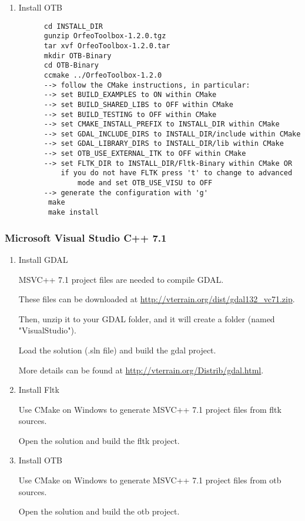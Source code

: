 \begin{enumerate}
\item Install OTB
  \begin{verbatim}
      cd INSTALL_DIR
      gunzip OrfeoToolbox-1.2.0.tgz
      tar xvf OrfeoToolbox-1.2.0.tar
      mkdir OTB-Binary
      cd OTB-Binary
      ccmake ../OrfeoToolbox-1.2.0
      --> follow the CMake instructions, in particular:
	  --> set BUILD_EXAMPLES to ON within CMake
	  --> set BUILD_SHARED_LIBS to OFF within CMake
	  --> set BUILD_TESTING to OFF within CMake
	  --> set CMAKE_INSTALL_PREFIX to INSTALL_DIR within CMake
	  --> set GDAL_INCLUDE_DIRS to INSTALL_DIR/include within CMake
	  --> set GDAL_LIBRARY_DIRS to INSTALL_DIR/lib within CMake
	  --> set OTB_USE_EXTERNAL_ITK to OFF within CMake
	  --> set FLTK_DIR to INSTALL_DIR/Fltk-Binary within CMake OR
	      if you do not have FLTK press 't' to change to advanced
              mode and set OTB_USE_VISU to OFF 
	  --> generate the configuration with 'g'
       make
       make install
  \end{verbatim}
      
  
\end{enumerate}

\subsubsection{Microsoft Visual Studio C++ 7.1}
\begin{enumerate}
\item Install GDAL

	MSVC++ 7.1 project files are needed to compile GDAL.
	
	These files can be downloaded at \url{http://vterrain.org/dist/gdal132_vc71.zip}.
	
	Then, unzip it to your GDAL folder, and it will create a folder (named "VisualStudio").
	
	Load the solution (.sln file) and build the gdal project.
	
	More details can be found at \url{http://vterrain.org/Distrib/gdal.html}.

\item Install Fltk

	Use CMake on Windows to generate MSVC++ 7.1 project files from fltk sources.
	
	Open the solution and build the fltk project.

\item Install OTB

	Use CMake on Windows to generate MSVC++ 7.1 project files from otb sources.
	
	Open the solution and build the otb project.

\end{enumerate}

